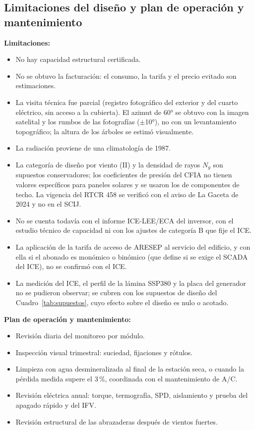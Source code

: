 \documentclass[12pt]{article}
\begin{document}
\subsection{Limitaciones del diseño y plan de operación y mantenimiento}
\textbf{Limitaciones:}
\begin{itemize}
\item No hay capacidad estructural certificada.
\item No se obtuvo la facturación: el consumo, la tarifa y el precio evitado son estimaciones.
\item La visita técnica fue parcial (registro fotográfico del exterior y del cuarto eléctrico, sin acceso a la cubierta). El azimut de 60° se obtuvo con la imagen satelital y los rumbos de las fotografías ($\pm$10°), no con un levantamiento topográfico; la altura de los árboles se estimó visualmente.
\item La radiación proviene de una climatología de 1987.
\item La categoría de diseño por viento (II) y la densidad de rayos $N_g$ son supuestos conservadores; los coeficientes de presión del CFIA no tienen valores específicos para paneles solares y se usaron los de componentes de techo. La vigencia del RTCR 458 se verificó con el aviso de La Gaceta de 2024 y no en el SCIJ.
\item No se cuenta todavía con el informe ICE-LEE/ECA del inversor, con el estudio técnico de capacidad ni con los ajustes de categoría B que fije el ICE.
\item La aplicación de la tarifa de acceso de ARESEP al servicio del edificio, y con ella si el abonado es monómico o binómico (que define si se exige el SCADA del ICE), no se confirmó con el ICE.
\item La medición del ICE, el perfil de la lámina SSP380 y la placa del generador no se pudieron observar; se cubren con los supuestos de diseño del Cuadro~\ref{tab:supuestos}, cuyo efecto sobre el diseño es nulo o acotado.
\end{itemize}

\textbf{Plan de operación y mantenimiento:}
\begin{itemize}
\item Revisión diaria del monitoreo por módulo.
\item Inspección visual trimestral: suciedad, fijaciones y rótulos.
\item Limpieza con agua desmineralizada al final de la estación seca, o cuando la pérdida medida supere el 3\,\%, coordinada con el mantenimiento de A/C.
\item Revisión eléctrica anual: torque, termografía, SPD, aislamiento y prueba del apagado rápido y del IFV.
\item Revisión estructural de las abrazaderas después de vientos fuertes.
\end{itemize}
\end{document}
